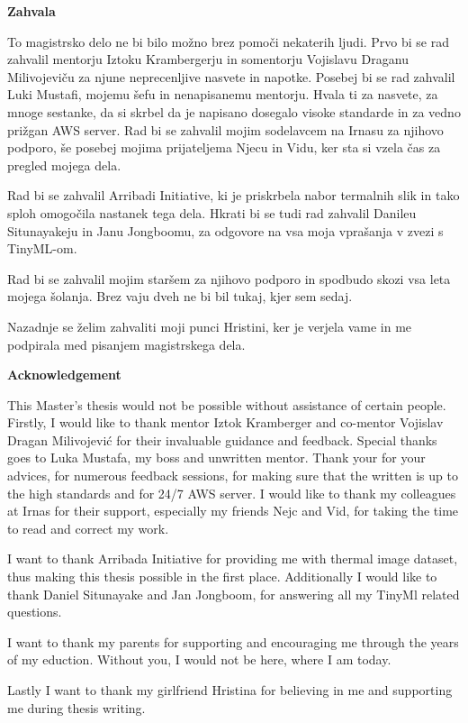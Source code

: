 \begin{poglavje}
\noindent\bfseries Zahvala
\end{poglavje}

To magistrsko delo ne bi bilo možno brez pomoči nekaterih ljudi.
Prvo bi se rad zahvalil mentorju Iztoku Krambergerju in somentorju Vojislavu Draganu Milivojeviču za njune neprecenljive nasvete in napotke.
Posebej bi se rad zahvalil Luki Mustafi, mojemu šefu in nenapisanemu mentorju.
Hvala ti za nasvete, za mnoge sestanke, da si skrbel da je napisano dosegalo visoke standarde in za vedno prižgan AWS server.
Rad bi se zahvalil mojim sodelavcem na Irnasu za njihovo podporo, še posebej mojima prijateljema Njecu in Vidu, ker sta si vzela čas za pregled mojega dela.

Rad bi se zahvalil Arribadi Initiative, ki je priskrbela nabor termalnih slik in tako sploh omogočila nastanek tega dela.
Hkrati bi se tudi rad zahvalil Danileu Situnayakeju in Janu Jongboomu, za odgovore na vsa moja vprašanja v zvezi s TinyML-om.

Rad bi se zahvalil mojim staršem za njihovo podporo in spodbudo skozi vsa leta mojega šolanja.
Brez vaju dveh ne bi bil tukaj, kjer sem sedaj.

Nazadnje se želim zahvaliti moji punci Hristini, ker je verjela vame in me podpirala med pisanjem magistrskega dela.
\clearpage

\begin{poglavje}
\noindent\bfseries Acknowledgement
\end{poglavje}

This Master's thesis would not be possible without assistance of certain people.
Firstly, I would like to thank mentor Iztok Kramberger and co-mentor Vojislav Dragan Milivojević for their invaluable guidance and feedback.
Special thanks goes to Luka Mustafa, my boss and unwritten mentor.
Thank your for your advices, for numerous feedback sessions, for making sure that the written is up to the high standards and for 24/7 AWS server.
I would like to thank my colleagues at Irnas for their support, especially my friends Nejc and Vid, for taking the time to read and correct my work.

I want to thank Arribada Initiative for providing me with thermal image dataset, thus making this thesis possible in the first place.
Additionally I would like to thank Daniel Situnayake and Jan Jongboom, for answering all my TinyMl related questions.

I want to thank my parents for supporting and encouraging me through the years of my eduction. 
Without you, I would not be here, where I am today.

Lastly I want to thank my girlfriend Hristina for believing in me and supporting me during thesis writing.
\newpage
